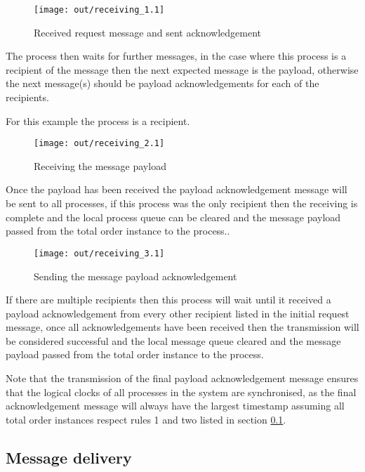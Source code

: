 \documentclass[twocolumn]{article}
\begin{document}
\begin{figure}[h!]
  \centering
  \texttt{[image: out/receiving\_1.1]}
  \caption{Received request message and sent acknowledgement}
  \label{fig:receiving_1}
\end{figure}
\FloatBarrier

The process then waits for further messages, in the case where this process is a
recipient of the message then the next expected message is the payload,
otherwise the next message(s) should be payload acknowledgements for each of the
recipients.

For this example the process is a recipient.

\begin{figure}[h!]
  \centering
  \texttt{[image: out/receiving\_2.1]}
  \caption{Receiving the message payload}
  \label{fig:receiving_2}
\end{figure}
\FloatBarrier

Once the payload has been received the payload acknowledgement message will be
sent to all processes, if this process was the only recipient then the receiving
is complete and the local process queue can be cleared and the message payload
passed from the total order instance to the process..

\begin{figure}[h!]
  \centering
  \texttt{[image: out/receiving\_3.1]}
  \caption{Sending the message payload acknowledgement}
  \label{fig:receiving_3}
\end{figure}
\FloatBarrier

If there are multiple recipients then this process will wait until it received
a payload acknowledgement from every other recipient listed in the initial
request message, once all acknowledgements have been received then the
transmission will be considered successful and the local message queue cleared
and the message payload passed from the total order instance to the process.

Note that the transmission of the final payload acknowledgement message ensures
that the logical clocks of all processes in the system are synchronised, as the
final acknowledgement message will always have the largest timestamp assuming
all total order instances respect rules 1 and two listed in section
\ref{sec:delivery}.

\subsection{Message delivery}
\label{sec:delivery}
\end{document}
